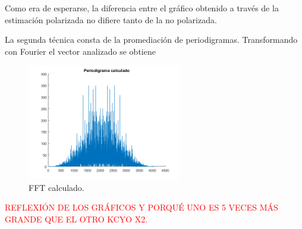 Como era de esperarse, la diferencia entre el gráfico obtenido a través de la estimación polarizada no difiere tanto de la no polarizada.

La segunda técnica consta de la promediación de periodigramas. Transformando con Fourier el vector analizado se obtiene
\begin{figure}[H]
\centering
	\includegraphics[width=0.6\textwidth, trim = {0 0 0 0.725cm},clip]{./ImagenesEjercicio2/period-calc.png}
	\caption{FFT calculado.}
	\label{fig:fft-calc}
\end{figure}

\textcolor{red}{REFLEXIÓN DE LOS GRÁFICOS Y PORQUÉ UNO ES 5 VECES MÁS GRANDE QUE EL OTRO KCYO X2.}


